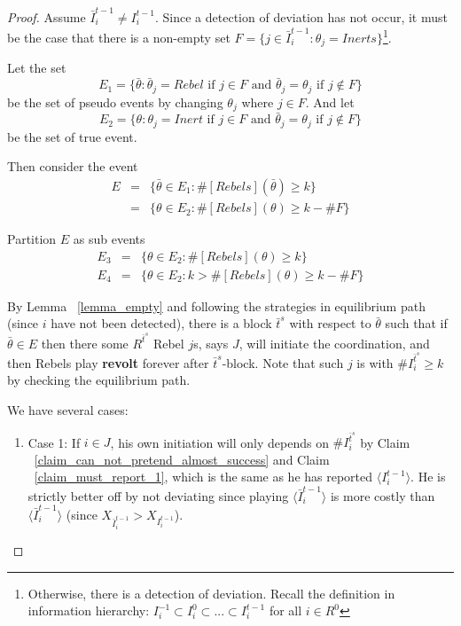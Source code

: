 \documentclass[12pt,letter]{article}
\theoremstyle{definition}
\theoremstyle{remark}
\theoremstyle{claim}
\begin{document}
\begin{proof}
Assume $\bar{I}^{t-1}_i\neq I^{t-1}_i$. Since a detection of deviation has not occur, it must be the case that there is a non-empty set $F=\{j\in \bar{I}^{t-1}_i:\theta_j=Inerts\}$\footnote{Otherwise, there is a detection of deviation. Recall the definition in information hierarchy: $I^{-1}_i\subset I^{0}_i\subset...\subset I^{t-1}_i$ for all $i\in R^0$}. 


Let the set 
\[E_1=\{\bar{\theta}: \bar{\theta}_j=Rebel \text{ if } j\in F \text { and }\bar{\theta}_j=\theta_j \text{ if } j\notin F\}\]
be the set of pseudo events by changing $\theta_j$ where $j\in F$. And let
\[E_2=\{\theta: \theta_j=Inert \text{ if }j\in F \text { and }\bar{\theta}_j=\theta_j \text{ if } j\notin F\}\]
be the set of true event.

Then consider the event
\begin{eqnarray*}
E 	&= &\{\bar{\theta}\in E_1: \#[Rebels](\bar{\theta})\geq k\}\\
 	&= &\{\theta\in E_2: \#[Rebels](\theta)\geq k-\#F\}
\end{eqnarray*}

Partition $E$ as sub events
\begin{eqnarray*}
E_3 	&= &\{\theta\in E_2: \#[Rebels](\theta)\geq k\}\\
E_4 	&= &\{\theta\in E_2: k>\#[Rebels](\theta)\geq k-\#F\}
\end{eqnarray*}

By Lemma ~\ref{lemma_empty} and following the strategies in equilibrium path (since $i$ have not been detected), there is a block $\bar{t}^{s}$ with respect to $\bar{\theta}$ such that if $\bar{\theta}\in E$ then there some $R^{\bar{t}^s}$ Rebel $j$s, says $J$, will initiate the coordination, and then Rebels play \textbf{revolt} forever after $\bar{t}^s$-block. Note that such $j$ is with $\# {I}^{\bar{t}^{s}}_i \geq k$ by checking the equilibrium path.

We have several cases:
\begin{enumerate}
\item Case 1: If $i\in J$, his own initiation will only depends on $\# I^{\bar{t}^s}_i$ by Claim ~\ref{claim_can_not_pretend_almost_success} and Claim ~\ref{claim_must_report_1}, which is the same as he has reported $\langle {I}^{t-1}_i\rangle$. He is strictly better off by not deviating since playing $\langle\bar{I}^{t-1}_i\rangle$ is more costly than $\langle\bar{I}^{t-1}_i\rangle$ (since $X_{\bar{I}^{t-1}_i}>X_{I^{t-1}_i}$).


\end{enumerate}
\end{proof}
\end{document}
